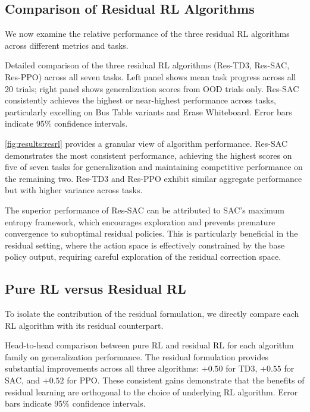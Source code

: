 \subsection{Comparison of Residual RL Algorithms}
\label{sec:results:algorithms}

We now examine the relative performance of the three residual \ac{RL} algorithms across different metrics and tasks.

{Detailed comparison of the three residual \ac{RL} algorithms (Res-TD3, Res-SAC, Res-PPO) across all seven tasks. Left panel shows mean task progress across all 20 trials; right panel shows generalization scores from \ac{OOD} trials only. Res-SAC consistently achieves the highest or near-highest performance across tasks, particularly excelling on Bus Table variants and Erase Whiteboard. Error bars indicate 95\% confidence intervals.}

\autoref{fig:results:resrl} provides a granular view of algorithm performance. Res-SAC demonstrates the most consistent performance, achieving the highest scores on five of seven tasks for generalization and maintaining competitive performance on the remaining two. Res-TD3 and Res-PPO exhibit similar aggregate performance but with higher variance across tasks.

The superior performance of Res-SAC can be attributed to SAC's maximum entropy framework, which encourages exploration and prevents premature convergence to suboptimal residual policies. This is particularly beneficial in the residual setting, where the action space is effectively constrained by the base policy output, requiring careful exploration of the residual correction space.

\subsection{Pure RL versus Residual RL}
\label{sec:results:pure-vs-residual}

To isolate the contribution of the residual formulation, we directly compare each \ac{RL} algorithm with its residual counterpart.

{Head-to-head comparison between pure \ac{RL} and residual \ac{RL} for each algorithm family on generalization performance. The residual formulation provides substantial improvements across all three algorithms: $+0.50$ for TD3, $+0.55$ for SAC, and $+0.52$ for PPO. These consistent gains demonstrate that the benefits of residual learning are orthogonal to the choice of underlying \ac{RL} algorithm. Error bars indicate 95\% confidence intervals.}


